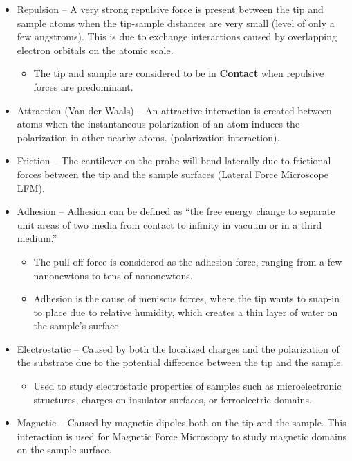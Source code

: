 \documentclass{../lab}
\begin{document}
    \begin{itemize}
        \item Repulsion – A very strong repulsive force is present between the tip and sample atoms when the tip-sample distances are very small (level of only a few angstroms).  This is due to exchange interactions caused by overlapping electron orbitals on the atomic scale.

        \begin{itemize}
            \item The tip and sample are considered to be in \textbf{Contact} when repulsive forces are predominant.

        \end{itemize}

        \item Attraction (Van der Waals) – An attractive interaction is created between atoms when the instantaneous polarization of an atom induces the polarization in other nearby atoms. (polarization interaction).

        \item Friction – The cantilever on the probe will bend laterally due to frictional forces between the tip and the sample surfaces (Lateral Force Microscope LFM).

        \item Adhesion – Adhesion can be defined as ``the free energy change to separate unit areas of two media from contact to infinity in vacuum or in a third medium.''

        \begin{itemize}
            \item The pull-off force is considered as the adhesion force, ranging from a few nanonewtons to tens of nanonewtons.

            \item Adhesion is the cause of meniscus forces, where the tip wants to snap-in to place due to relative humidity, which creates a thin layer of water on the sample's surface
        \end{itemize}

        \item Electrostatic – Caused by both the localized charges and the polarization of the substrate due to the potential difference between the tip and the sample.

        \begin{itemize}
            \item Used to study electrostatic properties of samples such as microelectronic structures, charges on insulator surfaces, or ferroelectric domains.
        \end{itemize}

        \item Magnetic – Caused by magnetic dipoles both on the tip and the sample. This interaction is used for Magnetic Force Microscopy to study magnetic domains on the sample surface.

    \end{itemize}
\end{document}
